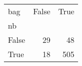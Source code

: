 \begin{tabular}{lrr}
\toprule
bag &  False &  True  \\
nb    &        &        \\
\midrule
False &     29 &     48 \\
True  &     18 &    505 \\
\bottomrule
\end{tabular}
